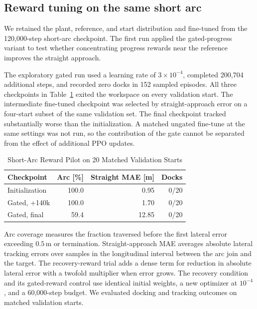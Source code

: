 \documentclass[conference]{IEEEtran}
\begin{document}
\subsection{Reward tuning on the same short arc}
We retained the plant, reference, and start distribution and fine-tuned
from the 120,000-step short-arc checkpoint. The first run applied the
gated-progress variant to test whether concentrating progress rewards
near the reference improves the straight approach.

The exploratory gated run used a learning rate of $3\times10^{-4}$,
completed 200,704 additional steps, and recorded zero docks in 152
sampled episodes. All three checkpoints in Table~\ref{tab:reward-pilot}
exited the workspace on every validation start. The intermediate
fine-tuned checkpoint was selected by straight-approach error on a
four-start subset of the same validation set. The final checkpoint
tracked substantially worse than the initialization. A matched
ungated fine-tune at the same settings was not run, so the contribution
of the gate cannot be separated from the effect of additional PPO
updates.

\begin{table}[t]
  \centering
  \caption{Short-Arc Reward Pilot on 20 Matched Validation Starts}
  \label{tab:reward-pilot}
  \begin{tabular}{lrrr}
    \toprule
    Checkpoint & Arc [\%] & Straight MAE [m] & Docks \\
    \midrule
    Initialization & 100.0 & 0.95 & 0/20 \\
    Gated, +140k & 100.0 & 1.70 & 0/20 \\
    Gated, final & 59.4 & 12.85 & 0/20 \\
    \bottomrule
  \end{tabular}
\end{table}

Arc coverage measures the fraction traversed before the first lateral
error exceeding $0.5\,\mathrm{m}$ or termination. Straight-approach
MAE averages absolute lateral tracking errors over samples in the
longitudinal interval between the arc join and the target. The
recovery-reward trial adds a dense term for reduction in
absolute lateral error with a twofold multiplier when error grows.
The recovery condition and its gated-reward control use identical
initial weights, a new optimizer at $10^{-4}$, and a 60,000-step
budget. We evaluated docking and tracking outcomes on matched
validation starts.
\end{document}
